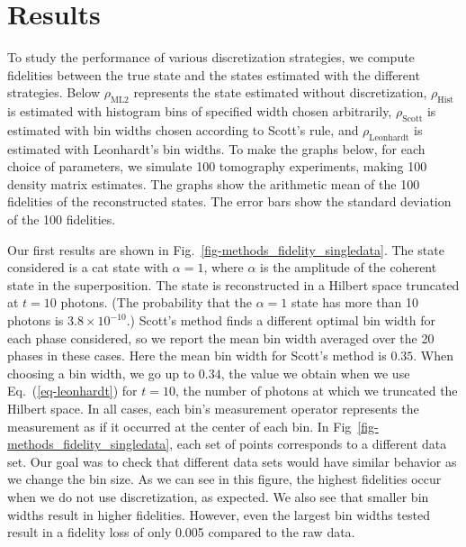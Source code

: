 \documentclass[
reprint,
superscriptaddress,
showpacs,
amsmath,
amssymb,
aps,
pra,
longbibliography
]{revtex4-1}
\begin{document}
\section{Results}
\label{results}
To study the performance of various discretization strategies, we
compute fidelities between the true state and the states estimated
with the different strategies. Below $\rho_{\mathrm{ML2}}$
represents the state estimated without discretization,
$\rho_{\mathrm{Hist}}$ is estimated with histogram bins of specified
width chosen arbitrarily, $\rho_{\mathrm{Scott}}$ is estimated with
bin widths chosen according to Scott's rule, and
$\rho_{\mathrm{Leonhardt}}$ is estimated with Leonhardt's bin
widths. To make the graphs below, for each choice of parameters, we simulate 
100 tomography experiments, making 100 density matrix estimates.  The
graphs show the arithmetic mean of the 100 fidelities of the
reconstructed states. The error bars show the standard deviation of
the 100 fidelities.

Our first results are shown in
Fig.~\ref{fig-methods_fidelity_singledata}. The state considered is a
cat state with $\alpha = 1$, where $\alpha$ is the amplitude of the
coherent state in the superposition.  The state is reconstructed in a
Hilbert space truncated at $t=10$ photons. (The probability that
  the $\alpha=1$ state has more than 10 photons is $3.8 \times 10^{-10}$.) 
  Scott's method finds a different optimal bin width for each phase considered,
so we report the mean bin width averaged over the 20 phases in these
cases.  Here the mean bin width for Scott's method is $0.35$.  When
choosing a bin width, we go up to $0.34$, the value we obtain when we
use Eq.~(\ref{eq-leonhardt}) for $t=10$, the number of photons at
which we truncated the Hilbert space.  In all cases, each bin's
measurement operator represents the measurement as if it occurred at
the center of each bin. In Fig~\ref{fig-methods_fidelity_singledata}, 
each set of points corresponds to a different data set. Our goal was 
to check that different data sets would have similar behavior as we change 
the bin size. As we can see in this figure, the highest fidelities occur when 
we do not use discretization, as expected.  We also see that smaller bin
widths result in higher fidelities.  However,
even the largest bin widths tested result in a fidelity loss of only
0.005 compared to the raw data.
\end{document}
